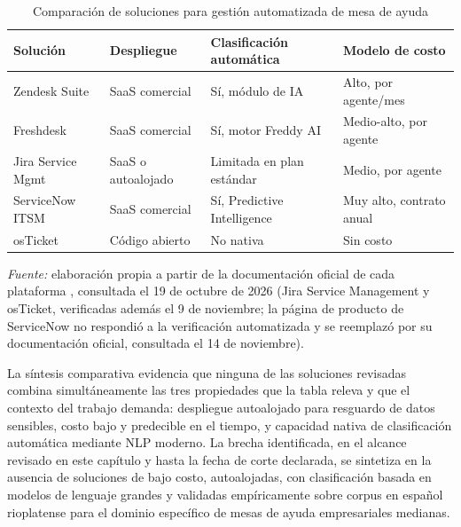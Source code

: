 \begin{table}[htbp]
\centering
\caption{Comparación de soluciones para gestión automatizada de mesa de ayuda}
\label{tab:comparativa}
\small
\begin{tabular}{@{}>{\raggedright\arraybackslash}p{2.6cm} >{\raggedright\arraybackslash}p{2.8cm} >{\raggedright\arraybackslash}p{3.5cm} >{\raggedright\arraybackslash}p{3.8cm}@{}}
\toprule
\textbf{Solución} & \textbf{Despliegue} & \textbf{Clasificación automática} & \textbf{Modelo de costo} \\
\midrule
Zendesk Suite     & SaaS comercial      & Sí, módulo de IA                & Alto, por agente/mes \\
Freshdesk         & SaaS comercial      & Sí, motor Freddy AI             & Medio-alto, por agente \\
Jira Service Mgmt & SaaS o autoalojado  & Limitada en plan estándar       & Medio, por agente \\
ServiceNow ITSM   & SaaS comercial      & Sí, Predictive Intelligence     & Muy alto, contrato anual \\
osTicket          & Código abierto      & No nativa                       & Sin costo \\
\bottomrule
\end{tabular}
\par\smallskip
{\footnotesize\textit{Fuente:} elaboración propia a partir de la documentación oficial de cada plataforma \parencite{Zendesk2026_help_desk,Freshdesk2026_platform,Atlassian2026_jira_service_management,ServiceNow2026_itsm,osTicket2026}, consultada el 19 de octubre de 2026 (Jira Service Management y osTicket, verificadas además el 9 de noviembre; la página de producto de ServiceNow no respondió a la verificación automatizada y se reemplazó por su documentación oficial, consultada el 14 de noviembre).\par}
\end{table}

La síntesis comparativa evidencia que ninguna de las soluciones revisadas combina simultáneamente las tres propiedades que la tabla releva y que el contexto del trabajo demanda: despliegue autoalojado para resguardo de datos sensibles, costo bajo y predecible en el tiempo, y capacidad nativa de clasificación automática mediante NLP moderno. La brecha identificada, en el alcance revisado en este capítulo y hasta la fecha de corte declarada, se sintetiza en la ausencia de soluciones de bajo costo, autoalojadas, con clasificación basada en modelos de lenguaje grandes y validadas empíricamente sobre corpus en español rioplatense para el dominio específico de mesas de ayuda empresariales medianas.

